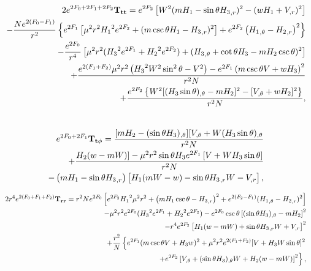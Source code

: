 \begin{eqnarray}
&& 2e^{2F_0+2F_1+2F_2}{\bf T_{tt}}=e^{2F_2}\left[ W^2(m{H_1}  
- \sin\theta  
{H_3}_{,r} )^2
-(wH_1+V_{,r})^2\right] \nonumber \\
% 
&&
-\frac{N e^{2 ({F_0}-F_1)}}{r^2} \left\{e^{2 {F_1}}\left[ {\mu^2} r^2 {H_1}^2 e^{2 {F_2}}
+({m} \csc \theta  {H_1}
-{H_3}_{,r})^2\right] +e^{2
{F_2}}\left( {H_1}_{,\theta}- 
{H_2}_{,r}\right)^2\right\}
\nonumber \\
%
&&
- \frac{e^{2 F_0}}{r^4} \left[{\mu^2} 
r^2( {H_3}^2 e^{2 {F_1}}+ {H_2}^2 e^{2
{F_2}}) + ({H_3}_{,\theta}+ \cot
\theta  {H_3}-mH_2\csc\theta)^2\right]  \nonumber \\
%
%
&&
+\frac{ e^{2 (F_1+{F_2})} {\mu^2} r^2\left({H_3}^2  W^2 \sin ^2\theta  - V^2\right) -e^{2 {F_1}}\left(
{m} \csc\theta 
 V +w{H_3}  \right)^2 }{r^2N} \nonumber \\
 &&
 +\frac{ e^{2 {F_2}}\left\{W^2[(H_3\sin\theta)_{,\theta}-mH_2]^2-[V_{,\theta}+wH_2]^2\right\}}{r^2N}, \nonumber \\
 && 
%
\end{eqnarray}


\begin{eqnarray}
&&  e^{2F_0+2F_1}{\bf T_{t\phi}}=\frac{[mH_2-(\sin\theta H_3)_{,\theta}][V_{,\theta}+W(H_3\sin\theta)_{,\theta}}{r^2N} \nonumber\\
&& +\frac{H_2(w-mW)]-{\mu^2}r^2 \sin\theta {H_3} e^{2 {F_1}} \left[ 
V+WH_3 \sin\theta\right]}{r^2N}\nonumber \\ 
%
&&
- \left({m} {H_1}-\sin\theta 
{H_3}_{,r}\right) \left[{H_1} ({m} W-w)-\sin \theta {H_3}_{,r} W-V_{,r}\right],
\end{eqnarray}






\begin{eqnarray}
&& 2r^4e^{2(F_0+F_1+F_2)}{\bf T_{rr}}=
r^2 N e^{2 {F_0}} \left[
e^{2 F_2} {H_1}^2 {\mu^2} r^2
+\left( {m H_1} \csc\theta- {H_3}_{,r}\right)^2+e^{2 ({F_2}-F_1)}( {H_1}_{,\theta}-
{H_2}_{,r})^2\right] \nonumber \\ 
%
&&
-{\mu^2} r^2e^{2 {F_0}}( {H_3}^2 e^{2 {F_1}}+{H_2}^2e^{2F_2})-e^{2 {F_0}}\csc\theta\left[(\sin\theta{H_3})_{,\theta}-mH_2\right]^2  \nonumber \\
%
&&
-r^4 e^{2 {F_2}} \left[ {H_1} (w-{m} W) + \sin\theta  {H_3}_{,r} W+  
V_{,r}\right]^2 \\
%
%
%
&&
+\frac{r^2}{N} \left\{e^{2 {F_1}}({m} \csc\theta 
 V+{H_3}w)^2 +{\mu^2} r^2e^{2 ({F_1}+F_2)}[V+ {H_3} W \sin\theta]^2 
 \right. \nonumber \\
&& \left.
+e^{2 {F_2}}\left[
V_{,\theta}+ (\sin\theta  
{H_3})_{,\theta} W+ 
{H_2} (w-{m} W)\right]^2\right\},
%
\end{eqnarray}





